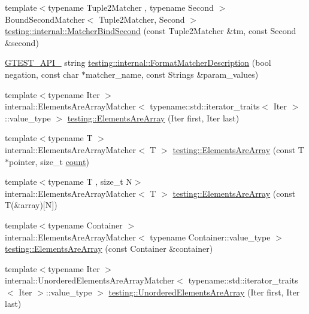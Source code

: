 \begin{DoxyCompactItemize}
{\footnotesize template$<$typename Tuple2\+Matcher , typename Second $>$ }\\Bound\+Second\+Matcher$<$ Tuple2\+Matcher, Second $>$ \hyperlink{namespacetesting_1_1internal_a31eb77a2bb0ca713d6ef07d8a3b9af9e}{testing\+::internal\+::\+Matcher\+Bind\+Second} (const Tuple2\+Matcher \&tm, const Second \&second)
\item 
\hyperlink{gtest-port_8h_aa73be6f0ba4a7456180a94904ce17790}{G\+T\+E\+S\+T\+\_\+\+A\+P\+I\+\_\+} string \hyperlink{namespacetesting_1_1internal_a593b52fcbb46a765a31850661b1960f4}{testing\+::internal\+::\+Format\+Matcher\+Description} (bool negation, const char $\ast$matcher\+\_\+name, const Strings \&param\+\_\+values)
\item 
{\footnotesize template$<$typename Iter $>$ }\\internal\+::\+Elements\+Are\+Array\+Matcher$<$ typename\+::std\+::iterator\+\_\+traits$<$ Iter $>$\+::value\+\_\+type $>$ \hyperlink{namespacetesting_ae2eee06e7ddbf5f5372fd24372e9703f}{testing\+::\+Elements\+Are\+Array} (Iter first, Iter last)
\item 
{\footnotesize template$<$typename T $>$ }\\internal\+::\+Elements\+Are\+Array\+Matcher$<$ T $>$ \hyperlink{namespacetesting_abf5c2219b4e6a7542368b5f68eadd007}{testing\+::\+Elements\+Are\+Array} (const T $\ast$pointer, size\+\_\+t \hyperlink{gmock__stress__test_8cc_afd9db40e3361ae09188795e8cbe19752}{count})
\item 
{\footnotesize template$<$typename T , size\+\_\+t N$>$ }\\internal\+::\+Elements\+Are\+Array\+Matcher$<$ T $>$ \hyperlink{namespacetesting_ac5895c9867d6b976351446a043dcdd66}{testing\+::\+Elements\+Are\+Array} (const T(\&array)\mbox{[}N\mbox{]})
\item 
{\footnotesize template$<$typename Container $>$ }\\internal\+::\+Elements\+Are\+Array\+Matcher$<$ typename Container\+::value\+\_\+type $>$ \hyperlink{namespacetesting_ad257747adbe056feaa92f449063d681f}{testing\+::\+Elements\+Are\+Array} (const Container \&container)
\item 
{\footnotesize template$<$typename Iter $>$ }\\internal\+::\+Unordered\+Elements\+Are\+Array\+Matcher$<$ typename\+::std\+::iterator\+\_\+traits$<$ Iter $>$\+::value\+\_\+type $>$ \hyperlink{namespacetesting_ab4896081406209171a1596b7028e1cf7}{testing\+::\+Unordered\+Elements\+Are\+Array} (Iter first, Iter last)
\item 

\end{DoxyCompactItemize}
